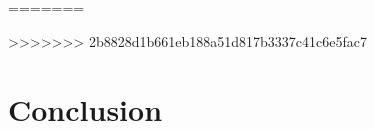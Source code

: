 \documentclass{article}
\begin{document}


=======



>>>>>>> 2b8828d1b661eb188a51d817b3337c41c6e5fac7



\section{Conclusion}




\end{document}
